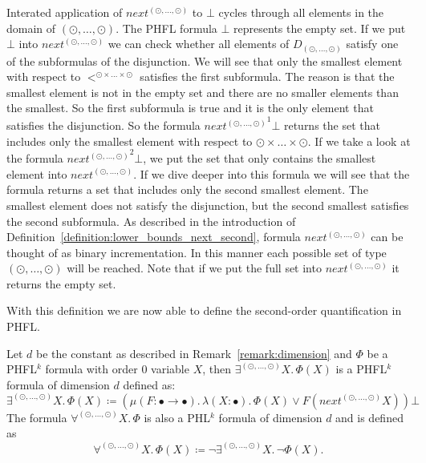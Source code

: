 \begin{remark}
\label{remark:lower_bounds_next_second}
	Interated application of $next^{(\odot, \dots, \odot)}$ to $\bot$ cycles through all elements in the domain of $(\odot, \dots, \odot)$. The PHFL formula $\bot$ represents the empty set. If we put $\bot$ into $next^{(\odot, \dots, \odot)}$ we can check whether all elements of $D_{(\odot, \dots, \odot)}$ satisfy one 
	of the subformulas of the disjunction. We will see that only the smallest element with respect to $<^{\odot\times\dots\times\odot}$ satisfies the first subformula. The reason is that the smallest element is not in the empty set and there are no smaller elements than the smallest.
	So the first subformula is true and it is the only element that satisfies the disjunction. So the formula ${next^{(\odot, \dots, \odot)}}^1 \bot$ returns the set that includes only the smallest 
	element with respect to $\odot \times \dots \times \odot$. If we take a look at the formula ${next^{(\odot, \dots, \odot)}}^2 \bot$, we put the set that only contains the smallest element into 
	$next^{(\odot, \dots, \odot)}$. If we dive deeper into this formula we will see that the formula returns a set that includes only the second smallest element. The smallest element does not 
	satisfy the disjunction, but the second smallest satisfies the second subformula. As described in the introduction of Definition~\ref{definition:lower_bounds_next_second}, formula $next^{(\odot, 
	\dots, \odot)}$ can be thought of as binary incrementation. In this manner each possible set of type $(\odot, \dots, \odot)$ will be reached. Note that if we put the full set into $next^{(\odot, 
	\dots, \odot)}$ it returns the empty set.
\end{remark}

With this definition we are now able to define the second-order quantification in PHFL.

\begin{definition}
    \label{definition:existential_quantification_second}
    Let $d$ be the constant as described in Remark~\ref{remark:dimension} and $\Phi$ be a PHFL$^k$ formula with order $0$ variable $X$, then $\exists^{(\odot, \dots, \odot)}X .\,\Phi(X)$
    is a PHFL$^k$ formula of dimension $d$ defined as:
    \[\exists^{(\odot, \dots, \odot)}X.\, \Phi(X) \coloneqq (\mu (F \colon \bullet \rightarrow \bullet).\, \lambda (X
    \colon \bullet).\, \Phi(X) \vee F(next^{(\odot, \dots, \odot)} X)) \bot
    \]
    The formula $\forall^{(\odot, \dots, \odot)}X.\,\Phi$ is also a PHL$^k$ formula of dimension $d$ and is defined as
    \[\forall^{(\odot, \dots, \odot)}X.\,\Phi(X) \coloneqq \neg \exists^{(\odot, \dots, \odot)}X .\,\neg\Phi(X).\]
\end{definition}


